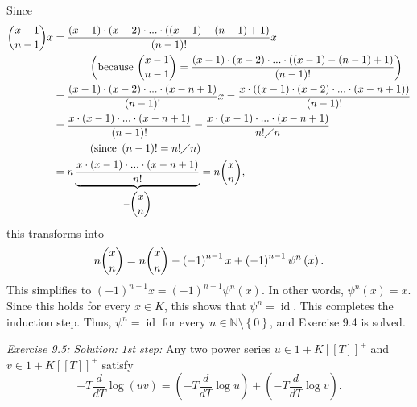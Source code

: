 \documentclass[numbers=enddot,12pt,final,onecolumn,notitlepage]{scrartcl}%
\begin{document}
Since%
\begin{align*}
\dbinom{x-1}{n-1}x &  =\dfrac{\left(  x-1\right)  \cdot\left(  x-2\right)
\cdot...\cdot\left(  \left(  x-1\right)  -\left(  n-1\right)  +1\right)
}{\left(  n-1\right)  !}x\\
&  \ \ \ \ \ \ \ \ \ \ \left(  \text{because }\dbinom{x-1}{n-1}=\dfrac{\left(
x-1\right)  \cdot\left(  x-2\right)  \cdot...\cdot\left(  \left(  x-1\right)
-\left(  n-1\right)  +1\right)  }{\left(  n-1\right)  !}\right)  \\
&  =\dfrac{\left(  x-1\right)  \cdot\left(  x-2\right)  \cdot...\cdot\left(
x-n+1\right)  }{\left(  n-1\right)  !}x=\dfrac{x\cdot\left(  \left(
x-1\right)  \cdot\left(  x-2\right)  \cdot...\cdot\left(  x-n+1\right)
\right)  }{\left(  n-1\right)  !}\\
&  =\dfrac{x\cdot\left(  x-1\right)  \cdot...\cdot\left(  x-n+1\right)
}{\left(  n-1\right)  !}=\dfrac{x\cdot\left(  x-1\right)  \cdot...\cdot\left(
x-n+1\right)  }{n!\diagup n}\\
&  \ \ \ \ \ \ \ \ \ \ \left(  \text{since }\left(  n-1\right)  !=n!\diagup
n\right)  \\
&  =n\underbrace{\dfrac{x\cdot\left(  x-1\right)  \cdot...\cdot\left(
x-n+1\right)  }{n!}}_{=\dbinom{x}{n}}=n\dbinom{x}{n},
\end{align*}
this transforms into%
\[
n\dbinom{x}{n}=n\dbinom{x}{n}-\left(  -1\right)  ^{n-1}x+\left(  -1\right)
^{n-1}\psi^{n}\left(  x\right)  .
\]
This simplifies to $\left(  -1\right)  ^{n-1}x=\left(  -1\right)  ^{n-1}%
\psi^{n}\left(  x\right)  $. In other words, $\psi^{n}\left(  x\right)  =x$.
Since this holds for every $x\in K$, this shows that $\psi^{n}%
=\operatorname*{id}$. This completes the induction step. Thus, $\psi
^{n}=\operatorname*{id}$ for every $n\in\mathbb{N}\setminus\left\{  0\right\}
$, and Exercise 9.4 is solved.

\textit{Exercise 9.5: Solution:} \textit{1st step:} Any two power series
$u\in1+K\left[  \left[  T\right]  \right]  ^{+}$ and $v\in1+K\left[  \left[
T\right]  \right]  ^{+}$ satisfy%
\begin{equation}
-T\dfrac{d}{dT}\log\left(  uv\right)  =\left(  -T\dfrac{d}{dT}\log u\right)
+\left(  -T\dfrac{d}{dT}\log v\right)  . \label{9.ex5.s1}%
\end{equation}
\end{document}
